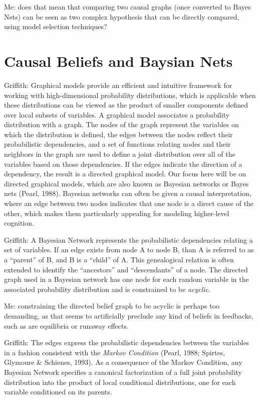 \documentclass[12pt]{article}
\begin{document}
Me: does that mean that comparing two causal graphs (once converted to Bayes Nets) can be seen as two complex hypothesis that can be directly compared, using model selection techniques? 


\section{Causal Beliefs and Baysian Nets}

Griffith: Graphical models provide an efficient and intuitive framework for working with high-dimensional probability distributions, which is applicable when these distributions can be viewed as the product of smaller components defined over local subsets of variables. A graphical model associates a probability distribution with a graph. The nodes of the graph represent the variables on which the distribution is defined, the edges between the nodes reflect their probabilistic dependencies, and a set of functions relating nodes and their
neighbors in the graph are used to define a joint distribution over all of the variables based on those dependencies. If the edges indicate the direction of a dependency, the result is a
directed graphical model. Our focus here will be on directed graphical models, which are also known as Bayesian networks or Bayes nets (Pearl, 1988). Bayesian networks can often be given a causal interpretation, where an edge between two nodes indicates that one node is a direct cause of the other, which makes them particularly appealing for modeling higher-level cognition.

Griffith:
A Bayesian Network represents the probabilistic dependencies relating a set of variables. If an edge exists from node A to node B, than A is referred to as a ``parent'' of B, and B is a ``child'' of A. This genealogical relation is often extended to identify the ``ancestors'' and ``descendants'' of a node. The directed graph used in a Bayesian network has one node for each random variable in the associated probability distribution and is constrained to be \textit{acyclic}. 

Me: constraining the directed belief graph to be acyclic is perhaps too demanding, as that seems to artificially preclude any kind of beliefs in feedbacks, such as are equilibria or runaway effects.      

Griffith:
The edges express the probabilistic dependencies between the variables in a fashion consistent with the \textit{Markov Condition} (Pearl, 1988; Spirtes, Glymoure \& Schienes, 1993). As a consequence of the Markov Condition, any Bayesian Network specifies a canonical factorization of a full joint probability distribution into the product of local conditional distributions, one for each variable conditioned on its parents. 
\end{document}
